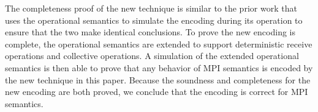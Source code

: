 The completeness proof of the new technique is similar to the prior work that uses the operational semantics to simulate the encoding during its operation to ensure that the two make identical conclusions. To prove the new encoding is complete, the operational semantics are extended to support deterministic receive operations and collective operations. A simulation of the extended operational semantics is then able to prove that any behavior of MPI semantics is encoded by the new technique in this paper. Because the soundness and completeness for the new encoding are both proved, we conclude that the encoding is correct for MPI semantics.
